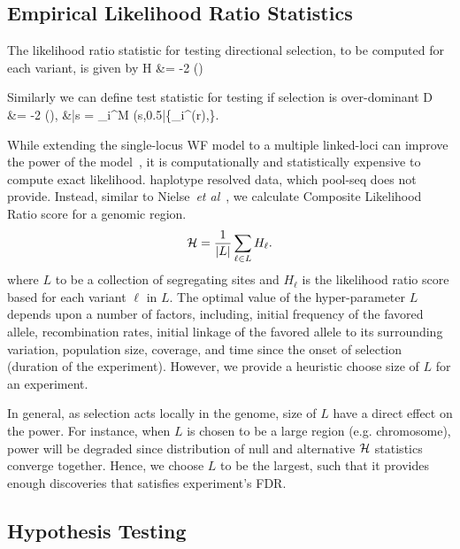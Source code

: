 \subsection{Empirical Likelihood Ratio Statistics}
The  likelihood
ratio statistic for testing directional selection, to be computed for each variant, 
is given by
\beq
	H &= -2 \log 
	\left(\right)\\
	\label{eq:ELRS}
\eeq

Similarly we can define test statistic for testing if selection is over-dominant 
 \beq
 D &= -2 \log 
 \left(\right),
 &\bar{s} =  \prod_i^M 
 \Lc(s,0.5|\{_i^{(r)},\hN\}.
 \eeq

While extending the single-locus WF model to a multiple linked-loci can 
improve the power of the model~\cite{Terhorst2015Multi}, it is 
computationally and statistically expensive to compute exact likelihood.
haplotype resolved data, which pool-seq does not provide. Instead, similar to 
Nielse~\emph{et al}~\cite{nielsen2005genomic}, we calculate  Composite 
Likelihood Ratio score for a genomic region.
\begin{equation}
{\cal H} = \frac{1}{|L|}\sum_{\ell \in L} H_\ell.
\label{eq:pihmm}
\end{equation}
where $L$ to be a collection of segregating sites
and  $H_\ell$  is the likelihood ratio score based for each variant $\ell$ in $L$.
The optimal value of the hyper-parameter $L$ depends upon a number of factors, 
including, initial frequency of the favored allele, recombination rates, initial 
linkage of the favored allele to its surrounding variation, population size, 
coverage, and time since the 
onset of selection (duration of the experiment). 
However, we provide a heuristic choose size of $L$ for an experiment.

In general, as selection acts locally in the genome, size of $L$ have a direct 
effect on the 
power. For instance, when $L$ is chosen to be a large region (e.g. 
chromosome), power will be degraded since distribution of null and 
alternative ${\cal H}$ statistics converge together. 
Hence, we choose $L$ to be the largest, such that it provides enough 
discoveries that satisfies experiment's FDR.


\subsection{Hypothesis Testing}
